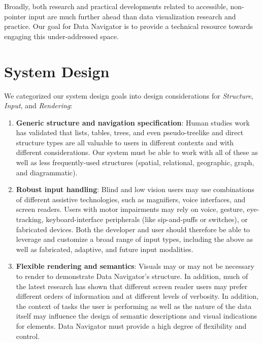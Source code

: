 \documentclass[journal]{vgtc}                %
\begin{document}
Broadly, both research and practical developments related to accessible, non-pointer input are much further ahead than data visualization research and practice. Our goal for Data Navigator is to provide a technical resource towards engaging this under-addressed space.

\section{System Design}

We categorized our system design goals into design considerations for \textit{Structure}, \textit{Input}, and \textit{Rendering}:
\begin{enumerate}
  \itemsep-0.4em
  \item \textbf{Generic structure and navigation specification}: Human studies work has validated that lists, tables, trees, and even pseudo-treelike and direct structure types are all valuable to users in different contexts and with different considerations. Our system must be able to work with all of these as well as less frequently-used structures (spatial, relational, geographic, graph, and diagrammatic).
  \item \textbf{Robust input handling}: Blind and low vision users may use combinations of different assistive technologies, such as magnifiers, voice interfaces, and screen readers. Users with motor impairments may rely on voice, gesture, eye-tracking, keyboard-interface peripherals (like sip-and-puffs or switches), or fabricated devices. Both the developer and user should therefore be able to leverage and customize a broad range of input types, including the above as well as fabricated, adaptive, and future input modalities.
  \item \textbf{Flexible rendering and semantics}: Visuals may or may not be necessary to render to demonstrate Data Navigator's structure. In addition, much of the latest research has shown that different screen reader users may prefer different orders of information and at different levels of verbosity. In addition, the context of tasks the user is performing as well as the nature of the data itself may influence the design of semantic descriptions and visual indications for elements. Data Navigator must provide a high degree of flexibility and control.
\end{enumerate}
\end{document}
